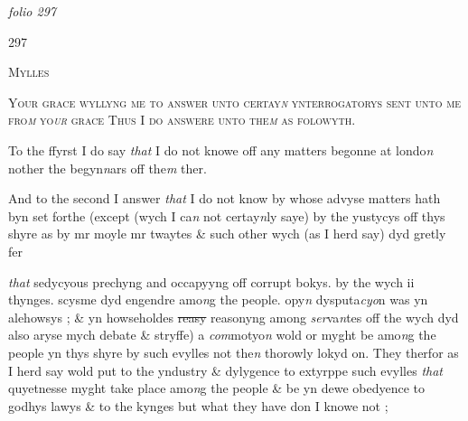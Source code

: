 \documentclass[12pt, a4paper]{book}
\begin{document}
\textit{folio 297}



            		\begin{flushright}{\color{Mahogany}297}\end{flushright}


				\begin{center}  {\scshape Mylles}  \end{center}
			

				\begin{center}  {\scshape Your grace  wyllyng me to answer unto certay\textit{n} ynterrogatorys
sent unto me fro\textit{m} yo\textit{ur} grace Thus I do answere unto the\textit{m} as folowyth. }  \end{center}
			


		\ifthenelse{\isodd{\thepage}}
		{\reversemarginpar}
		{\normalmarginpar}
		To the ffyrst I do say \textit{that} I do not knowe off any matters begonne at londo\textit{n} 
nother the begyn\textit{n}ars off the\textit{m} ther.


				\marginpar[\vspace{0.5cm}{\textcolor{Gray}{2}}]{}
			

		\ifthenelse{\isodd{\thepage}}
		{\reversemarginpar}
		{\normalmarginpar}
		 And to the second I answer \textit{that} I do not know by whose advyse matters hath byn
set forthe (except (wych I ca\textit{n} not certay\textit{n}ly saye) by the yustycys off thys shyre
as by mr moyle mr twaytes \& such other wych (as I herd say) dyd gretly fer \textit{}
			
               \textit{that} 
sedycyous prechyng and occapyyng off corrupt bokys. by the wych ii 
thynges. scysme dyd engendre amo\textit{n}g the people. opy\textit{n} dysputa\textit{cyo}n was yn 
alehowsys ; \& yn howseholdes \sout{reasy }reasonyng among \textit{ser}va\textit{n}tes off the wych dyd also
aryse mych debate \& stryffe) a \textit{com}motyo\textit{n} wold or myght be amo\textit{n}g the people
yn thys shyre by such evylles not the\textit{n} thorowly lokyd on. They therfor
as I herd say wold put to the yndustry \& dylygence to extyrppe such evylles
\textit{that} quyetnesse myght take place amo\textit{n}g the people \& be yn dewe obedyence 
to godhys lawys \& to the kynges but what they have don I knowe not ;

            		
				\marginpar[\vspace{0.5cm}{\textcolor{Gray}{3}}]{}
			
\end{document}
